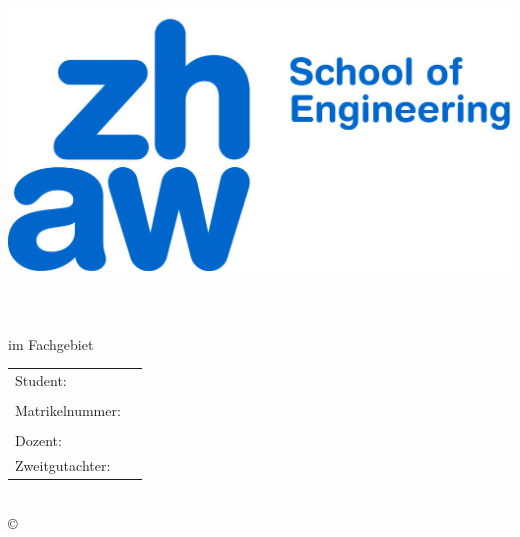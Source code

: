 \begin{titlepage}

\begin{center} 									%
\includegraphics[scale=0.25]{pic/ZHAW_Titel} 	%
\\[12ex]
\huge{\textbf{\textsc{\titel}}}					%
\\[3ex]
\LARGE{\textbf{\untertitel}}					%
\\[6ex]					
\LARGE{\textbf{\art}}							%
\\[4ex]
\Large{im Fachgebiet \fachgebiet}				%
\\[4ex]
\normalsize								%

\newpage										%

\begin{tabular}{w{3cm}p{6cm}}
\\[12ex]
Student: & \quad \autorFirst					%
\\[1.2ex]
\\[4ex]
Matrikelnummer: & \quad \matrikelnrFirst 		%
\\[1.2ex]
\\[4ex]
Dozent: & \quad \erstgutachter					%
\\[1.2ex]
Zweitgutachter: & \quad \zweitgutachter			%
\\[3ex]
\end{tabular}
\\[48ex]
\copyright\ \jahr\\
\end{center}


\end{titlepage}
